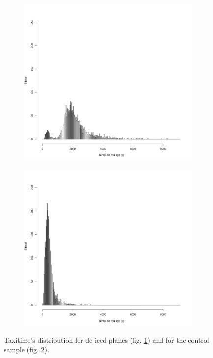 \documentclass{article}
\begin{document}
\begin{figure}[h!]
\captionsetup[subfigure]{justification=centering}
    \begin{subfigure}[t]{.5\textwidth}
        \includegraphics[width = \textwidth]{TempsRoulageDeicing.png}
        \caption{}
        \label{fig:TempsRoulageDeicing}
    \end{subfigure}
    \begin{subfigure}[t]{.5\textwidth}
        \includegraphics[width = \textwidth]{TempsRoulageControl3.png}
        \caption{}
        \label{fig:TempsRoulageControl3}
    \end{subfigure}
    \caption{Taxitime's distribution for de-iced planes (fig. \ref{fig:TempsRoulageDeicing}) and for the control sample (fig. \ref{fig:TempsRoulageControl3}).}
    \label{fig:TempsRoulage}
\end{figure}
\end{document}
